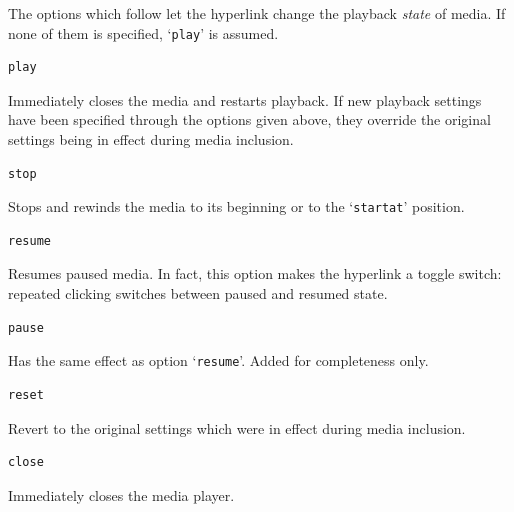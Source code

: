 \documentclass[a4paper]{article}
\begin{document}
The options which follow let the hyperlink change the playback \emph{state} of media. If none of them is specified, `\verb+play+' is assumed.
\begin{verbatim}
play
\end{verbatim}
Immediately closes the media and restarts playback. If new playback settings have been specified through the options given above, they override the original settings being in effect during media inclusion.
\begin{verbatim}
stop
\end{verbatim}
Stops and rewinds the media to its beginning or to the `\verb+startat+' position.
\begin{verbatim}
resume
\end{verbatim}
Resumes paused media. In fact, this option makes the hyperlink a toggle switch: repeated clicking switches between paused and resumed state.
\begin{verbatim}
pause
\end{verbatim}
Has the same effect as option `\verb+resume+'. Added for completeness only.
\begin{verbatim}
reset
\end{verbatim}
Revert to the original settings which were in effect during media inclusion.
\begin{verbatim}
close
\end{verbatim}
Immediately closes the media player.
\end{document}
